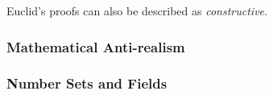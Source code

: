 Euclid's proofs can also be described as \textit{constructive}. \\





\subsubsection{Mathematical Anti-realism}

\subsubsection{Number Sets and Fields}


